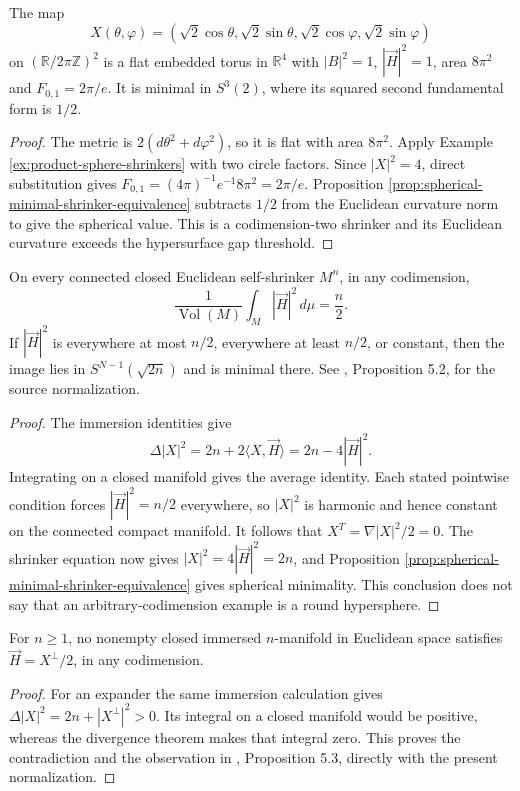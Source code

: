 \begin{example}\label{ex:clifford-torus-shrinker}
The map
\[
 X(\theta,\varphi)=(\sqrt2\cos\theta,\sqrt2\sin\theta,
 \sqrt2\cos\varphi,\sqrt2\sin\varphi)
\]
on $(\mathbb R/2\pi\mathbb Z)^2$ is a flat embedded torus in $\mathbb R^4$ with $|B|^2=1$, $|\vec H|^2=1$, area $8\pi^2$ and $F_{0,1}=2\pi/e$. It is minimal in $S^3(2)$, where its squared second fundamental form is $1/2$.
\end{example}
\begin{proof}
The metric is $2(d\theta^2+d\varphi^2)$, so it is flat with area $8\pi^2$. Apply Example \ref{ex:product-sphere-shrinkers} with two circle factors. Since $|X|^2=4$, direct substitution gives $F_{0,1}=(4\pi)^{-1}e^{-1}8\pi^2=2\pi/e$. Proposition \ref{prop:spherical-minimal-shrinker-equivalence} subtracts $1/2$ from the Euclidean curvature norm to give the spherical value. This is a codimension-two shrinker and its Euclidean curvature exceeds the hypersurface gap threshold.
\end{proof}

\begin{proposition}\label{prop:compact-shrinker-mean-curvature-threshold}
On every connected closed Euclidean self-shrinker $M^n$, in any codimension,
\[
 \frac1{\operatorname{Vol}(M)}\int_M|\vec H|^2\,d\mu=\frac n2.
\]
If $|\vec H|^2$ is everywhere at most $n/2$, everywhere at least $n/2$, or constant, then the image lies in $S^{N-1}(\sqrt{2n})$ and is minimal there. See \cite{CL12}, Proposition 5.2, for the source normalization.
\end{proposition}
\begin{proof}
The immersion identities give
\[
 \Delta|X|^2=2n+2\langle X,\vec H\rangle=2n-4|\vec H|^2.
\]
Integrating on a closed manifold gives the average identity. Each stated pointwise condition forces $|\vec H|^2=n/2$ everywhere, so $|X|^2$ is harmonic and hence constant on the connected compact manifold. It follows that $X^T=\nabla|X|^2/2=0$. The shrinker equation now gives $|X|^2=4|\vec H|^2=2n$, and Proposition \ref{prop:spherical-minimal-shrinker-equivalence} gives spherical minimality. This conclusion does not say that an arbitrary-codimension example is a round hypersphere.
\end{proof}

\begin{proposition}\label{prop:no-closed-higher-codimension-expander}
For $n\geq1$, no nonempty closed immersed $n$-manifold in Euclidean space satisfies $\vec H=X^\perp/2$, in any codimension.
\end{proposition}
\begin{proof}
For an expander the same immersion calculation gives $\Delta|X|^2=2n+|X^\perp|^2>0$. Its integral on a closed manifold would be positive, whereas the divergence theorem makes that integral zero. This proves the contradiction and the observation in \cite{CL12}, Proposition 5.3, directly with the present normalization.
\end{proof}

